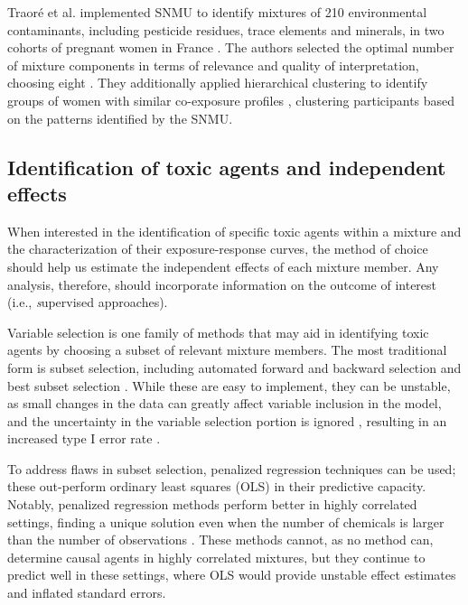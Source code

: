 Traor\'{e} et al. implemented SNMU to identify mixtures of 210 environmental contaminants, including pesticide residues, trace elements and minerals, in two cohorts of pregnant women in France \cite{traore2018}. The authors selected the optimal number of mixture components in terms of relevance and quality of interpretation, choosing eight \cite{traore2018}. They additionally applied hierarchical clustering to identify groups of women with similar co-exposure profiles \cite{traore2018}, clustering participants based on the patterns identified by the SNMU.

\subsection{Identification of toxic agents and independent effects}\label{sec:Ind}

When interested in the identification of specific toxic agents within a mixture and the characterization of their exposure-response curves, the method of choice should help us estimate the independent effects of each mixture member. Any analysis, therefore, should incorporate information on the outcome of interest (i.e., {\textit supervised} approaches).

Variable selection is one family of methods that may aid in identifying toxic agents by choosing a subset of relevant mixture members. The most traditional form is subset selection, including automated forward and backward selection and best subset selection \cite{ISLR}. While these are easy to implement, they can be unstable, as small changes in the data can greatly affect variable inclusion in the model, and the uncertainty in the variable selection portion is ignored \cite{shen2002adaptive, fan2001variable}, resulting in an increased type I error rate \cite{leamer1978specification, raftery1996approximate, draper1995assessment}.

To address flaws in subset selection, penalized regression techniques can be used; these out-perform ordinary least squares (OLS) in their predictive capacity. Notably, penalized regression methods perform better in highly correlated settings, finding a unique solution even when the number of chemicals is larger than the number of observations \cite{fan2006statistical}. These methods cannot, as no method can, determine causal agents in highly correlated mixtures, but they continue to predict well in these settings, where OLS would provide unstable effect estimates and inflated standard errors. 

